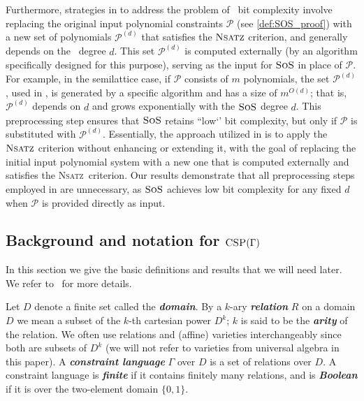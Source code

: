 \documentclass[11pt]{article}
\newcommand{\sos}{\text{\sc{SoS}}}
\newcommand{\CSP}{\textsc{CSP}}
\newcommand{\Nsatz}{\textsc{Nsatz}}
\newcommand{\1}{\textbf{1}}
\begin{document}
Furthermore, strategies in \cite{BharathiM21,BulatovRSTOC22,BulatovARXIV21, Mastrolilli21TALG} to address the problem of \sos\ bit complexity involve replacing the original input polynomial constraints \(\mathcal{P}\) (see \cref{def:SOS_proof}) with a new set of polynomials $\mathcal{P}^{(d)}$ that satisfies the \(\Nsatz\) criterion, and generally depends on the \sos\ degree \(d\). This set $\mathcal{P}^{(d)}$ is computed externally (by an algorithm specifically designed for this purpose), serving as the input for \(\sos\) in place of $\mathcal{P}$. For example, in the semilattice case, if $\mathcal{P}$ consists of $m$ polynomials, the set $\mathcal{P}^{(d)}$, used in \cite{BulatovRSTOC22,Mastrolilli21TALG}, is generated by a specific algorithm and has a size of \( m^{O(d)} \); that is, $\mathcal{P}^{(d)}$ depends on \( d \) and grows exponentially with the \(\sos\) degree \( d \). This preprocessing step ensures that \(\sos\) retains ``low`' bit complexity, but only if $\mathcal{P}$ is substituted with $\mathcal{P}^{(d)}$. Essentially, the approach utilized in \cite{BharathiM21,BulatovRSTOC22,BulatovARXIV21, Mastrolilli21TALG} is to apply the \(\Nsatz\) criterion without enhancing or extending it, with the goal of replacing the initial input polynomial system with a new one that is computed externally and satisfies the \Nsatz\ criterion.
Our results demonstrate that all preprocessing steps employed in \cite{BharathiM21,BulatovRSTOC22,Mastrolilli21TALG} are unnecessary, as \(\sos\) achieves low bit complexity for any fixed \( d \) when \(\mathcal{P}\) is provided directly as input.



\subsection[Background and notation for CSP's]{Background and notation for \(\CSP(\Gamma)\)}\label{sect:CSP_IMP_background}
In this section we give the basic definitions and results that we will need later.
We refer to~\cite{barto_et_al:DFU:2017:6959,2017dfu7,Chen09, Mastrolilli21TALG, BulatovRSTOC22} for more details.

Let $D$ denote a finite set called the  \textbf{\emph{domain}}.
By a $k$-ary \textbf{\emph{relation}} $R$ on a domain $D$ we mean a subset of the $k$-th cartesian power $D^k$; $k$ is said to be the \textbf{\emph{arity}} of the relation. We often use relations and (affine) varieties interchangeably since both are subsets of $D^k$ (we will not refer to varieties from universal algebra in this paper). A \textbf{\emph{constraint language}} $\Gamma$ over $D$ is a set of relations over $D$. A constraint language is \textbf{\emph{finite}} if it contains finitely many relations, and is \textbf{\emph{Boolean}} if it is over the two-element domain $\{0,1\}$. 
\end{document}
